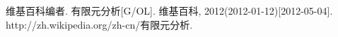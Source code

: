 \cleardoublepage
{}
{}

\begin{thebibliography}{00}\label{ref:ref}
\setlength{\itemsep}{-5pt}
\songti{}

维基百科编者. 
有限元分析[G/OL]. 
维基百科, 
2012(2012-01-12)[2012-05-04]. http://zh.wikipedia.org/zh-cn/有限元分析.

\end{thebibliography}

